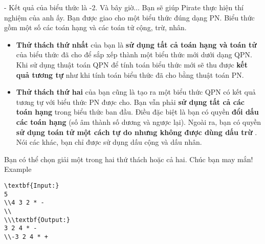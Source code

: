 - Kết quả của biểu thức là -2.
Và bây giờ...
Bạn sẽ giúp Pirate thực hiện thí nghiệm của anh ấy. Bạn được giao cho một biểu thức đúng dạng PN. Biểu thức gồm một số các toán hạng và các toán tử cộng, trừ, nhân.  
\begin{itemize}
	\item \textbf{      Thử thách thứ nhất     }    của bạn là    \textbf{      sử dụng tất cả toán hạng và toán tử}    của biểu thức đã cho để sắp xếp thành một biểu thức mới dưới dạng QPN. Khi sử dụng thuật toán QPN để tính toán biểu thức mới sẽ thu được    \textbf{     kết quả tương tự    }    như khi tính toán biểu thức đã cho bằng thuật toán PN.   
	\item \textbf{      Thử thách thứ hai     }    của bạn cũng là tạo ra một biểu thức QPN có kết quả tương tự với biểu thức PN được cho. Bạn vẫn phải    \textbf{sử dụng tất cả các toán hạng}    trong biểu thức ban đầu. Điều đặc biệt là bạn có quyền    \textbf{đổi dấu các toán hạng}    (số âm thành số dương và ngược lại). Ngoài ra, bạn có quyền    \textbf{sử dụng toán tử một cách tự do nhưng không được dùng dấu trừ}    . Nói các khác, bạn chỉ được sử dụng dấu cộng và dấu nhân.   
\end{itemize}

   Bạn có thể chọn giải một trong hai thứ thách hoặc cả hai. Chúc bạn may mắn!
Example
\begin{verbatim}
\textbf{Input:}
5
\\4 3 2 * -
\\
\\\textbf{Output:}
3 2 4 * -
\\-3 2 4 * + \end{verbatim}

